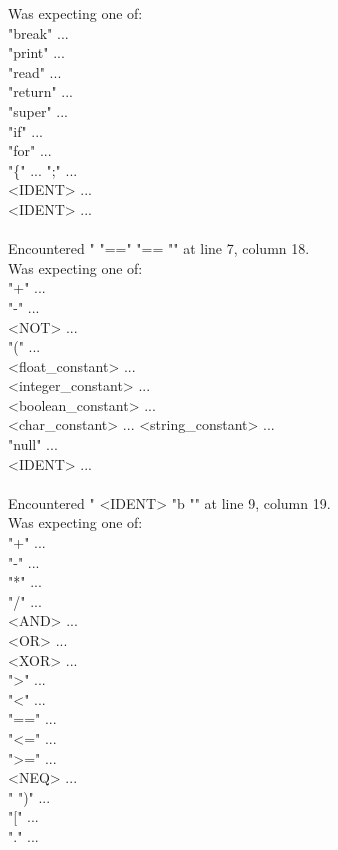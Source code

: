 \documentclass[
	article,			%
	11pt,				%
	oneside,			%
	a4paper,			%
	portuguese,			%
	brazil,				%
	sumario=tradicional
	]{abntex2}
\begin{document}
Was expecting one of:\\
    "break" ...\\
    "print" ...\\
    "read" ...\\
    "return" ...\\
    "super" ...\\
    "if" ...\\
    "for" ...\\
    "\{" ...
    ";" ...\\
    <IDENT> ...\\
    <IDENT> ...\\
\\
Encountered " "==" "== "" at line 7, column 18.\\
Was expecting one of:\\
    "+" ...\\
    "-" ...\\
    <NOT> ...\\
    "(" ...\\
    <float\_constant> ...\\
    <integer\_constant> ...\\
    <boolean\_constant> ...\\
    <char\_constant> ...
    <string\_constant> ...\\
    "null" ...\\
    <IDENT> ...\\
\\
Encountered " <IDENT> "b "" at line 9, column 19.\\
Was expecting one of:\\
    "+" ...\\
    "-" ...\\
    "*" ...\\
    "/" ...\\
    <AND> ...\\
    <OR> ...\\
    <XOR> ...\\
    ">" ...\\
    "<" ...\\
    "==" ...\\
    "<=" ...\\
    ">=" ...\\
    <NEQ> ...\\
    "%
    ")" ...\\
    "[" ...\\
    "." ...\\
\\
\end{document}
